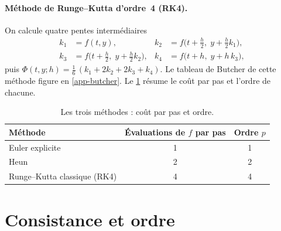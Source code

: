 \paragraph{Méthode de Runge--Kutta d'ordre~4 (RK4).}
On calcule quatre pentes intermédiaires
\begin{align*}
  k_1&=f(t,y), & k_2&=f\bigl(t+\tfrac h2,\;y+\tfrac h2k_1\bigr),\\
  k_3&=f\bigl(t+\tfrac h2,\;y+\tfrac h2k_2\bigr), & k_4&=f\bigl(t+h,\;y+h\,k_3\bigr),
\end{align*}
puis $\Phi(t,y;h)=\tfrac16\,(k_1+2k_2+2k_3+k_4)$. Le tableau de Butcher de cette méthode figure en \cref{app-butcher}. Le \cref{tab-methodes} résume le coût par pas et l'ordre de chacune.

\begin{table}[tb]
  \centering
  \caption{Les trois méthodes : coût par pas et ordre.}\label{tab-methodes}
  \small
  \begin{tabular}{@{}lcc@{}}
    \toprule
    Méthode & Évaluations de $f$ par pas & Ordre $p$\\
    \midrule
    Euler explicite & 1 & 1\\
    Heun            & 2 & 2\\
    Runge--Kutta classique (RK4) & 4 & 4\\
    \bottomrule
  \end{tabular}
\end{table}

\section{Consistance et ordre}\label{sec-consistance}



